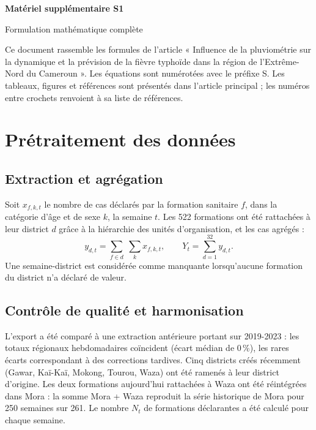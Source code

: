 \documentclass[11pt]{article}
\begin{document}
\sloppy
\thispagestyle{fancy}
\par\vspace{2pt}
\noindent{\color{navy}\rule{\linewidth}{1.2pt}}\par\vspace{8pt}
{\raggedright\sffamily\bfseries\LARGE\color{navy}Matériel supplémentaire S1\par}\vspace{4pt}
{\raggedright\sffamily\large\color{navy}Formulation mathématique complète\par}\vspace{10pt}
\noindent Ce document rassemble les formules de l'article « Influence de la pluviométrie sur la dynamique et la prévision de la fièvre typhoïde dans la région de l'Extrême-Nord du Cameroun ». Les équations sont numérotées avec le préfixe S. Les tableaux, figures et références sont présentés dans l'article principal ; les numéros entre crochets renvoient à sa liste de références.
\section{Prétraitement des données}


\subsection{Extraction et agrégation}
Soit $x_{f,k,t}$ le nombre de cas déclarés par la formation sanitaire $f$, dans la catégorie d'âge et de sexe $k$, la semaine $t$. Les 522 formations ont été rattachées à leur district $d$ grâce à la hiérarchie des unités d'organisation, et les cas agrégés :
\begin{equation}
y_{d,t}=\sum_{f\in d}\;\sum_{k} x_{f,k,t}, \qquad Y_t=\sum_{d=1}^{32} y_{d,t}.
\label{eq:agg}
\end{equation}
Une semaine-district est considérée comme manquante lorsqu'aucune formation du district n'a déclaré de valeur.

\subsection{Contrôle de qualité et harmonisation}
L'export a été comparé à une extraction antérieure portant sur 2019-2023 : les totaux régionaux hebdomadaires coïncident (écart médian de 0\,\%), les rares écarts correspondant à des corrections tardives. Cinq districts créés récemment (Gawar, Kaï-Kaï, Mokong, Tourou, Waza) ont été ramenés à leur district d'origine. Les deux formations aujourd'hui rattachées à Waza ont été réintégrées dans Mora : la somme Mora + Waza reproduit la série historique de Mora pour 250 semaines sur 261. Le nombre $N_t$ de formations déclarantes a été calculé pour chaque semaine.
\end{document}
